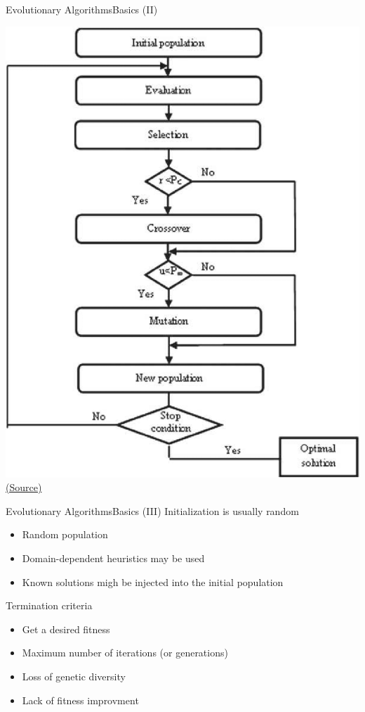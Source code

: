 \documentclass[10pt,compress]{beamer} %
\begin{document}
\begin{frame}{Evolutionary Algorithms}{Basics (II)} 
	\begin{center}
		\includegraphics[width=0.45\linewidth]{figs/flow.png}\\
		\tiny{\href{https://www.researchgate.net/figure/The-Genetic-Algorithm-flowchart_fig1_339515126}{(Source)}}\\
	\end{center}
\end{frame}

\begin{frame}{Evolutionary Algorithms}{Basics (III)}
	Initialization is usually random
	\begin{itemize}
		\item Random population
		\item Domain-dependent heuristics may be used
		\item Known solutions migh be injected into the initial population
	\end{itemize}
	Termination criteria
	\begin{itemize}
		\item Get a desired fitness
		\item Maximum number of iterations (or generations)
		\item Loss of genetic diversity
		\item Lack of fitness improvment
	\end{itemize}
\end{frame}
\end{document}
